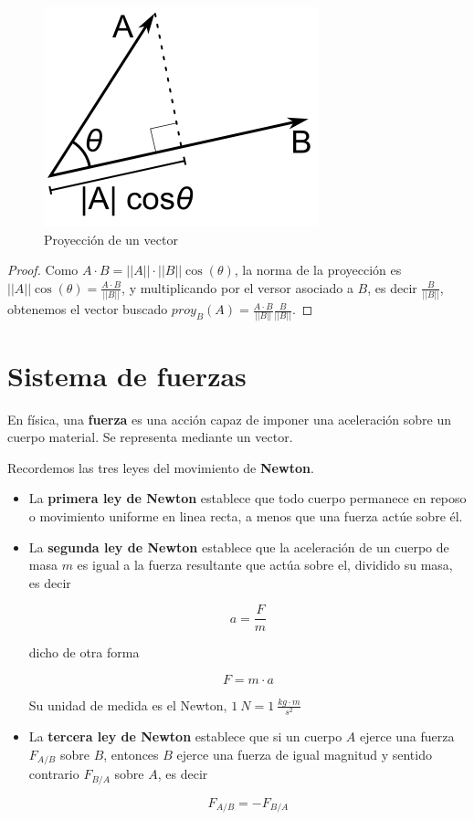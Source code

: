 \begin{figure}[h]
\centering\includegraphics[scale=0.5]{images/01_precalculo/proyeccion_vector.png}
\caption{Proyección de un vector}
\end{figure}

\begin{proof}
Como $ A \cdot B = ||A|| \cdot ||B|| \cos(\theta)$, la norma de la proyección es $||A|| \cos(\theta) = \frac{A \cdot B}{||B||} $, y multiplicando por el versor asociado a $B$, es decir $\frac{B}{||B||}$, obtenemos el vector buscado $proy_B(A) = \frac{A \cdot B}{||B||} \frac{B}{||B||}$.
\end{proof}

\section{Sistema de fuerzas} 

En física, una \textbf{fuerza} es una acción capaz de imponer una aceleración sobre un cuerpo material.  Se representa mediante un vector. 

Recordemos las tres leyes del movimiento de \textbf{Newton}.

\begin{itemize}
\item La \textbf{primera ley de Newton} establece que todo cuerpo permanece en reposo o movimiento uniforme en linea recta, a menos que una fuerza actúe sobre él.

\item La \textbf{segunda ley de Newton} establece que la aceleración de un cuerpo de masa $m$ es igual a la fuerza resultante que actúa sobre el, dividido su masa, es decir

$$ a = \frac{F}{m} $$

dicho de otra forma

$$F = m \cdot a$$

Su unidad de medida es el Newton, $1 \ N = 1 \ \frac{kg \cdot m}{s^2} $

\item La \textbf{tercera ley de Newton} establece que si un cuerpo $A$ ejerce una fuerza $F_{A/B}$ sobre $B$, entonces $B$ ejerce una fuerza de igual magnitud y sentido contrario $F_{B/A}$ sobre $A$, es decir

$$ F_{A/B} = - F_{B/A} $$

\end{itemize}

